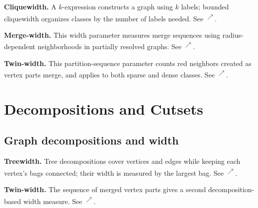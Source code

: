 \documentclass[11pt]{article}
\newcommand{\source}[2]{\textsuperscript{\href{https://laxarchive.org/#1/#2.html}{$\nearrow$}}}
\newcommand{\surveychapter}[2]{\setcounter{section}{#1}\section{#2}}
\begin{document}
\textbf{Cliquewidth.}
A $k$-expression constructs a graph using $k$ labels;
bounded cliquewidth organizes classes by the number of labels needed. See
\source{lax-271696}{Lax271696.CliqueExpr}.

\textbf{Merge-width.}
This width parameter measures merge sequences using
radius-dependent neighborhoods in partially resolved graphs. See
\source{lax-9}{Lax9.MergeWidth}.

\textbf{Twin-width.}
This partition-sequence parameter counts red neighbors
created as vertex parts merge, and applies to both sparse and dense classes.
See \source{lax-228581}{Lax228581.TwinWidth}.
\surveychapter{11}{Decompositions and Cutsets}

\subsection{Graph decompositions and width}

\textbf{Treewidth.}
Tree decompositions cover vertices and edges while
keeping each vertex's bags connected; their width is measured by the largest
bag. See \source{lax-228581}{Lax228581.Treewidth}.

\textbf{Twin-width.}
The sequence of merged vertex parts gives a second
decomposition-based width measure. See
\source{lax-228581}{Lax228581.TwinWidth}.
\end{document}
